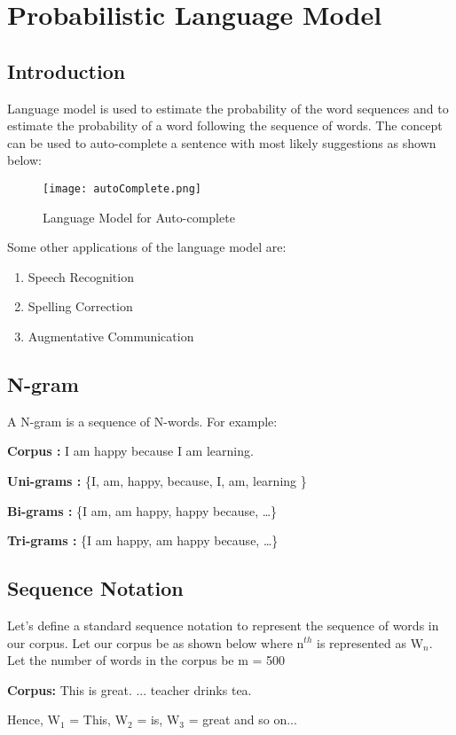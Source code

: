 \chapter{Probabilistic Language Model}
\section{Introduction}
Language model is used to estimate the probability of the word sequences and to estimate the probability of a word following the sequence of words. The concept can be used to auto-complete a sentence with most likely suggestions as shown below:
\begin{figure}[h]
	\centering
	\texttt{[image: autoComplete.png]}
	\caption{Language Model for Auto-complete}
	\label{fig:my_label}
\end{figure}

\noindent
Some other applications of the language model are:
\begin{enumerate}
	\item Speech Recognition
	\item Spelling Correction
	\item Augmentative Communication
\end{enumerate}

\section{N-gram}
A N-gram is a sequence of N-words. For example:

\textbf{Corpus :} I am happy because I am learning.

\textbf{Uni-grams :} \{I, am, happy, because, I, am, learning \}

\textbf{Bi-grams :} \{I am, am happy, happy because, …\}

\textbf{Tri-grams :} \{I am happy, am happy because, …\}

\section{Sequence Notation}
Let's define a standard sequence notation to represent the sequence of words in our corpus.	Let our corpus be as shown below where n$^{th}$ is represented as W$_n$.
Let the number of words in the corpus be m = 500

\textbf{Corpus:} This is great. ... teacher drinks tea.

Hence,  W$_1$ = This, W$_2$ = is, W$_3$ = great and so on...

